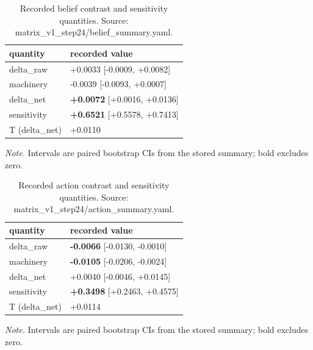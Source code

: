\documentclass[10pt]{article}
\begin{document}
\begin{table}[!t]
\centering
\footnotesize
\caption{ Recorded belief contrast and sensitivity quantities. Source: matrix\_v1\_step24/belief\_summary.yaml. }

\begin{tabular}{ ll }
\toprule
quantity & recorded value \\
\midrule

delta\_raw & +0.0033 [-0.0009, +0.0082] \\

machinery & -0.0039 [-0.0093, +0.0007] \\

delta\_net & \textbf{+0.0072} [+0.0016, +0.0136] \\

sensitivity & \textbf{+0.6521} [+0.5578, +0.7413] \\

T (delta\_net) & +0.0110 \\

\bottomrule
\end{tabular}

\par\footnotesize\emph{Note.} Intervals are paired bootstrap CIs from the stored summary; bold excludes zero.
\end{table}


\begin{table}[!t]
\centering
\footnotesize
\caption{ Recorded action contrast and sensitivity quantities. Source: matrix\_v1\_step24/action\_summary.yaml. }

\begin{tabular}{ ll }
\toprule
quantity & recorded value \\
\midrule

delta\_raw & \textbf{-0.0066} [-0.0130, -0.0010] \\

machinery & \textbf{-0.0105} [-0.0206, -0.0024] \\

delta\_net & +0.0040 [-0.0046, +0.0145] \\

sensitivity & \textbf{+0.3498} [+0.2463, +0.4575] \\

T (delta\_net) & +0.0114 \\

\bottomrule
\end{tabular}

\par\footnotesize\emph{Note.} Intervals are paired bootstrap CIs from the stored summary; bold excludes zero.
\end{table}
\end{document}
